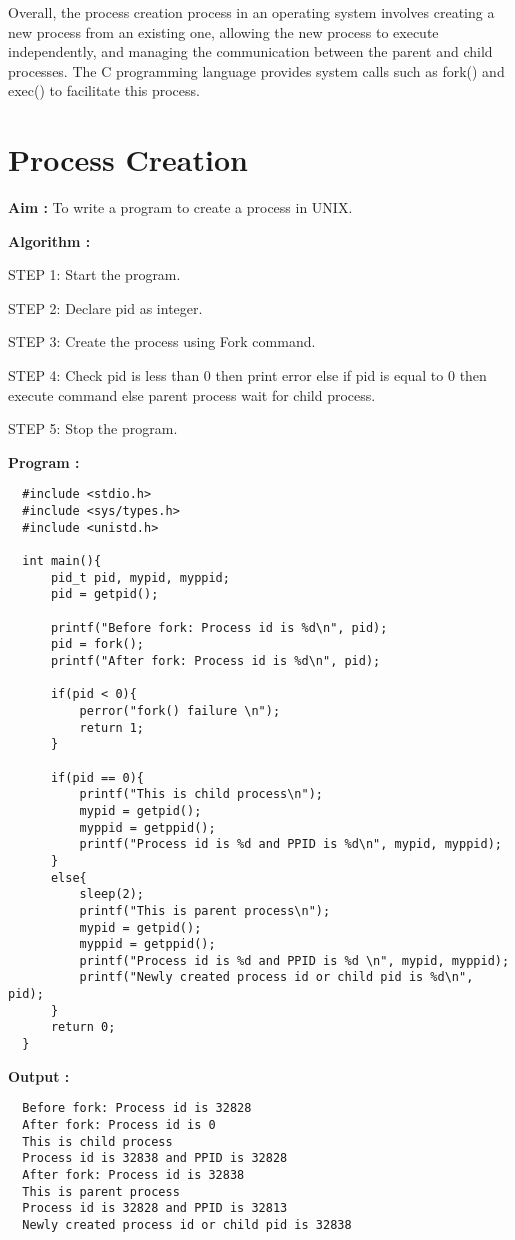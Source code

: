 \documentclass[journal,onecolumn]{IEEEtran}
\begin{document}
Overall, the process creation process in an operating system involves creating a new process from an existing one, allowing the new process to execute independently, and managing the communication between the parent and child processes. The C programming language provides system calls such as fork() and exec() to facilitate this process.


\section{Process Creation}
\textbf{Aim :} To write a program to create a process in UNIX.

\textbf{Algorithm :}
\begin{list}{}{}
  \item STEP 1: Start the program. 
  \item STEP 2: Declare pid as integer.
  \item STEP 3: Create the process using Fork command.
  \item STEP 4: Check pid is less than 0 then print error else if pid is equal to 0 then execute
  command else parent process wait for child process.
  \item STEP 5: Stop the program.
\end{list}


\textbf{Program :}
\begin{verbatim}
  #include <stdio.h>
  #include <sys/types.h>
  #include <unistd.h>

  int main(){
      pid_t pid, mypid, myppid;
      pid = getpid();

      printf("Before fork: Process id is %d\n", pid);
      pid = fork();
      printf("After fork: Process id is %d\n", pid);

      if(pid < 0){
          perror("fork() failure \n");
          return 1;
      }
      
      if(pid == 0){
          printf("This is child process\n");
          mypid = getpid();
          myppid = getppid();
          printf("Process id is %d and PPID is %d\n", mypid, myppid);
      }
      else{
          sleep(2);
          printf("This is parent process\n");
          mypid = getpid();
          myppid = getppid();
          printf("Process id is %d and PPID is %d \n", mypid, myppid);
          printf("Newly created process id or child pid is %d\n", pid);
      }
      return 0;
  }
\end{verbatim}

\textbf{Output :}
\begin{verbatim}
  Before fork: Process id is 32828
  After fork: Process id is 0
  This is child process
  Process id is 32838 and PPID is 32828
  After fork: Process id is 32838
  This is parent process
  Process id is 32828 and PPID is 32813 
  Newly created process id or child pid is 32838
\end{verbatim}
\end{document}
